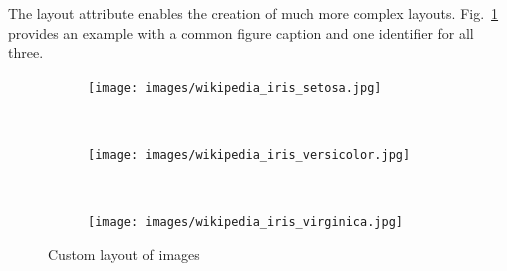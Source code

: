 \documentclass[
  letterpaper,
  DIV=11,
  numbers=noendperiod]{scrartcl}
\begin{document}
The layout attribute enables the creation of much more complex layouts.
Fig.~\ref{fig-custom-layout} provides an example with a common figure
caption and one identifier for all three.

\begin{figure}

\begin{minipage}{0.20\linewidth}

\begin{figure}[H]

{\centering \texttt{[image: images/wikipedia\_iris\_setosa.jpg]}

}


\end{figure}%

\end{minipage}%
%
\begin{minipage}{0.02\linewidth}
~\end{minipage}%
%
\begin{minipage}{0.46\linewidth}

\begin{figure}[H]

{\centering \texttt{[image: images/wikipedia\_iris\_versicolor.jpg]}

}


\end{figure}%

\end{minipage}%
%
\begin{minipage}{0.02\linewidth}
~\end{minipage}%
%
\begin{minipage}{0.30\linewidth}

\begin{figure}[H]

{\centering \texttt{[image: images/wikipedia\_iris\_virginica.jpg]}

}


\end{figure}%

\end{minipage}%

\caption{\label{fig-custom-layout}Custom layout of images}

\end{figure}%

\newpage
\end{document}
